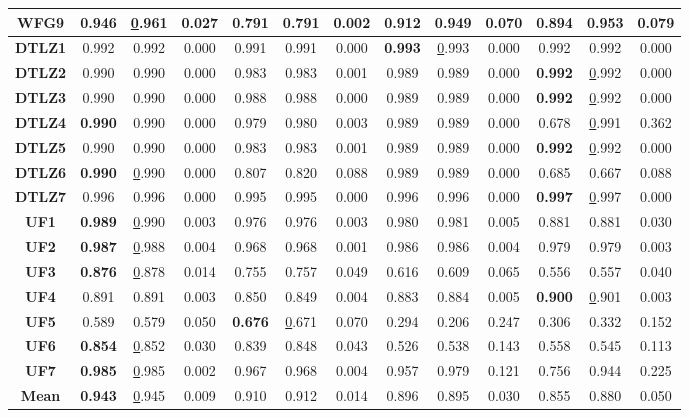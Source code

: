 \begin{table*}[t]
\begin{tabular}{cc|c|c|c|c|c|c|c|c|c|c|c}
\multicolumn{1}{c|}{\textbf{WFG9}} & \textbf{0.946} & {\ul 0.961} & 0.027 & 0.791 & 0.791 & 0.002 & 0.912 & 0.949 & 0.070 & 0.894 & 0.953 & 0.079 \\ \hline
\multicolumn{1}{c|}{\textbf{DTLZ1}} & 0.992 & 0.992 & 0.000 & 0.991 & 0.991 & 0.000 & \textbf{0.993} & {\ul 0.993} & 0.000 & 0.992 & 0.992 & 0.000 \\ \hline
\multicolumn{1}{c|}{\textbf{DTLZ2}} & 0.990 & 0.990 & 0.000 & 0.983 & 0.983 & 0.001 & 0.989 & 0.989 & 0.000 & \textbf{0.992} & {\ul 0.992} & 0.000 \\ \hline
\multicolumn{1}{c|}{\textbf{DTLZ3}} & 0.990 & 0.990 & 0.000 & 0.988 & 0.988 & 0.000 & 0.989 & 0.989 & 0.000 & \textbf{0.992} & {\ul 0.992} & 0.000 \\ \hline
\multicolumn{1}{c|}{\textbf{DTLZ4}} & \textbf{0.990} & 0.990 & 0.000 & 0.979 & 0.980 & 0.003 & 0.989 & 0.989 & 0.000 & 0.678 & {\ul 0.991} & 0.362 \\ \hline
\multicolumn{1}{c|}{\textbf{DTLZ5}} & 0.990 & 0.990 & 0.000 & 0.983 & 0.983 & 0.001 & 0.989 & 0.989 & 0.000 & \textbf{0.992} & {\ul 0.992} & 0.000 \\ \hline
\multicolumn{1}{c|}{\textbf{DTLZ6}} & \textbf{0.990} & {\ul 0.990} & 0.000 & 0.807 & 0.820 & 0.088 & 0.989 & 0.989 & 0.000 & 0.685 & 0.667 & 0.088 \\ \hline
\multicolumn{1}{c|}{\textbf{DTLZ7}} & 0.996 & 0.996 & 0.000 & 0.995 & 0.995 & 0.000 & 0.996 & 0.996 & 0.000 & \textbf{0.997} & {\ul 0.997} & 0.000 \\ \hline
\multicolumn{1}{c|}{\textbf{UF1}} & \textbf{0.989} & {\ul 0.990} & 0.003 & 0.976 & 0.976 & 0.003 & 0.980 & 0.981 & 0.005 & 0.881 & 0.881 & 0.030 \\ \hline
\multicolumn{1}{c|}{\textbf{UF2}} & \textbf{0.987} & {\ul 0.988} & 0.004 & 0.968 & 0.968 & 0.001 & 0.986 & 0.986 & 0.004 & 0.979 & 0.979 & 0.003 \\ \hline
\multicolumn{1}{c|}{\textbf{UF3}} & \textbf{0.876} & {\ul 0.878} & 0.014 & 0.755 & 0.757 & 0.049 & 0.616 & 0.609 & 0.065 & 0.556 & 0.557 & 0.040 \\ \hline
\multicolumn{1}{c|}{\textbf{UF4}} & 0.891 & 0.891 & 0.003 & 0.850 & 0.849 & 0.004 & 0.883 & 0.884 & 0.005 & \textbf{0.900} & {\ul 0.901} & 0.003 \\ \hline
\multicolumn{1}{c|}{\textbf{UF5}} & 0.589 & 0.579 & 0.050 & \textbf{0.676} & {\ul 0.671} & 0.070 & 0.294 & 0.206 & 0.247 & 0.306 & 0.332 & 0.152 \\ \hline
\multicolumn{1}{c|}{\textbf{UF6}} & \textbf{0.854} & {\ul 0.852} & 0.030 & 0.839 & 0.848 & 0.043 & 0.526 & 0.538 & 0.143 & 0.558 & 0.545 & 0.113 \\ \hline
\multicolumn{1}{c|}{\textbf{UF7}} & \textbf{0.985} & {\ul 0.985} & 0.002 & 0.967 & 0.968 & 0.004 & 0.957 & 0.979 & 0.121 & 0.756 & 0.944 & 0.225 \\ \hline
\multicolumn{1}{c|}{\textbf{Mean}} & \textbf{0.943} & {\ul 0.945} & 0.009 & 0.910 & 0.912 & 0.014 & 0.896 & 0.895 & 0.030 & 0.855 & 0.880 & 0.050 \\ \hline
\end{tabular}%
\end{table*}

